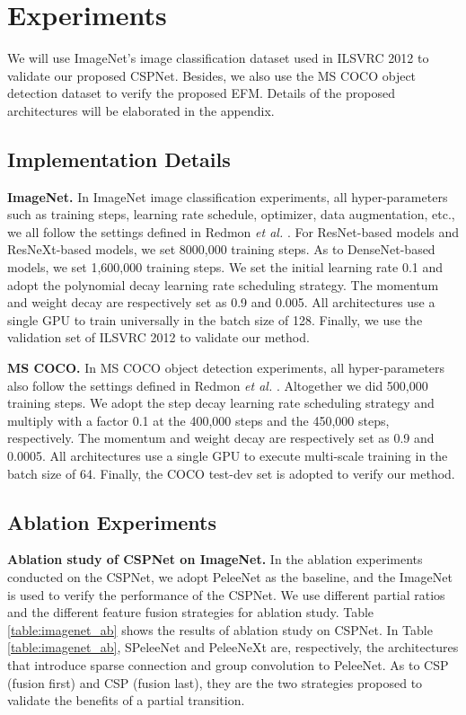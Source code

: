 \documentclass{article}
\begin{document}
\section{Experiments}


We will use ImageNet's image classification dataset \cite{deng2009imagenet} used in ILSVRC 2012 to validate our proposed CSPNet.  Besides, we also use the MS COCO object detection dataset \cite{lin2014microsoft} to verify the proposed EFM.  Details of the proposed architectures will be elaborated in the appendix.

\subsection{Implementation Details}

{\bf ImageNet.} In ImageNet image classification experiments, all hyper-parameters such as training steps, learning rate schedule, optimizer, data augmentation, etc., we all follow the settings defined in Redmon \textit{et al.} \cite{redmon2018yolov3}.  For ResNet-based models and ResNeXt-based models, we set 8000,000 training steps.  As to DenseNet-based models, we set 1,600,000 training steps.  We set the initial learning rate 0.1 and adopt the polynomial decay learning rate scheduling strategy.  The momentum and weight decay are respectively set as 0.9 and 0.005.  All architectures use a single GPU to train universally in the batch size of 128.  Finally, we use the validation set of ILSVRC 2012 to validate our method.  

{\bf MS COCO.} In MS COCO object detection experiments, all hyper-parameters also follow the settings defined in Redmon \textit{et al.} \cite{redmon2018yolov3}.  Altogether we did 500,000 training steps.  We adopt the step decay learning rate scheduling strategy and multiply with a factor 0.1 at the 400,000 steps and the 450,000 steps, respectively.  The momentum and weight decay are respectively set as 0.9 and 0.0005.  All architectures use a single GPU to execute multi-scale training in the batch size of 64.  Finally, the COCO test-dev set is adopted to verify our method.

\subsection{Ablation Experiments}

{\bf Ablation study of CSPNet on ImageNet.} In the ablation experiments conducted on the CSPNet, we adopt PeleeNet \cite{wang2018pelee} as the baseline, and the ImageNet is used to verify the performance of the CSPNet.  We use different partial ratios  and the different feature fusion strategies for ablation study.  Table \ref{table:imagenet_ab} shows the results of ablation study on CSPNet.  In Table \ref{table:imagenet_ab}, SPeleeNet and PeleeNeXt are, respectively, the architectures that introduce sparse connection and group convolution to PeleeNet.  As to CSP (fusion first) and CSP (fusion last), they are the two strategies proposed to validate the benefits of a partial transition. 
\end{document}

